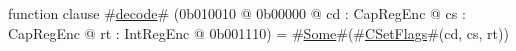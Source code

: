 function clause #\hyperref[sailMIPSzdecode]{decode}# (0b010010 @ 0b00000 @ cd : CapRegEnc @ cs : CapRegEnc @ rt : IntRegEnc @ 0b001110) = #\hyperref[sailMIPSzSome]{Some}#(#\hyperref[sailMIPSzCSetFlags]{CSetFlags}#(cd, cs, rt))
